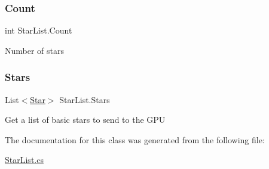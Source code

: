 \subsubsection{\texorpdfstring{Count}{Count}}
{\footnotesize\ttfamily int Star\+List.\+Count\hspace{0.3cm}{\ttfamily [get]}}



Number of stars 

\mbox{\label{class_star_list_ad2117c98c982f9af21b0c40e89ccce4d}} 
\subsubsection{\texorpdfstring{Stars}{Stars}}
{\footnotesize\ttfamily List$<$\mbox{\hyperlink{struct_star}{Star}}$>$ Star\+List.\+Stars\hspace{0.3cm}{\ttfamily [get]}}



Get a list of basic stars to send to the G\+PU 



The documentation for this class was generated from the following file\+:\begin{DoxyCompactItemize}
\item 
\mbox{\hyperlink{_star_list_8cs}{Star\+List.\+cs}}\end{DoxyCompactItemize}
